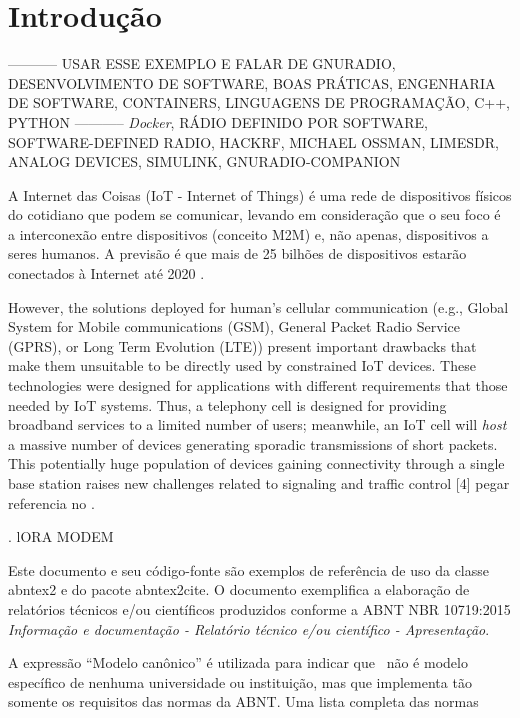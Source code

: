 \documentclass[
  12pt,				%
  openright,			%
  twoside,			%
  a4paper,			%
  english,			%
  french,				%
  spanish,			%
  brazil,				%
  ]{abntex2}
\begin{document}
\chapter*[Introdução]{Introdução}

----------- USAR ESSE EXEMPLO E FALAR DE GNURADIO, DESENVOLVIMENTO DE SOFTWARE, BOAS PRÁTICAS, ENGENHARIA DE SOFTWARE, CONTAINERS, LINGUAGENS DE PROGRAMAÇÃO, C++, PYTHON
----------- \textit{Docker}, RÁDIO DEFINIDO POR SOFTWARE, SOFTWARE-DEFINED RADIO, HACKRF, MICHAEL OSSMAN, LIMESDR, ANALOG DEVICES, SIMULINK, GNURADIO-COMPANION

A Internet das Coisas (IoT - Internet of Things) é uma rede de dispositivos físicos do cotidiano que podem se comunicar, levando em consideração que o seu foco é a interconexão entre dispositivos (conceito M2M) e, não apenas, dispositivos a seres humanos. A previsão é que mais de 25 bilhões de dispositivos estarão conectados à Internet até 2020 \cite[p. 1]{sanchez2017transmission}.

However, the solutions deployed for human’s cellular communication (e.g., Global System for Mobile communications (GSM), General Packet Radio Service (GPRS), or Long Term Evolution (LTE)) present important drawbacks that make them unsuitable to be directly used by constrained IoT devices. These technologies were designed for applications with
different requirements that those needed by IoT systems. Thus, a telephony cell is designed for providing broadband services to a limited number of users; meanwhile, an IoT cell will \textit{host} a massive number of devices generating sporadic transmissions of
short packets. This potentially huge population of devices gaining connectivity through a single base station raises new challenges related to signaling and traffic control [4] pegar referencia no \cite[p. 1]{sanchez2017transmission}.

\cite[p. 1]{AN1200.13}. lORA MODEM


Este documento e seu código-fonte são exemplos de referência de uso da classe
\textsf{abntex2} e do pacote \textsf{abntex2cite}. O documento
exemplifica a elaboração de relatórios técnicos e/ou científicos produzidos
conforme a ABNT NBR 10719:2015 \emph{Informação e documentação - Relatório
  técnico e/ou científico - Apresentação}.

A expressão ``Modelo canônico'' é utilizada para indicar que \abnTeX\ não é
modelo específico de nenhuma universidade ou instituição, mas que implementa tão
somente os requisitos das normas da ABNT. Uma lista completa das normas
\end{document}
